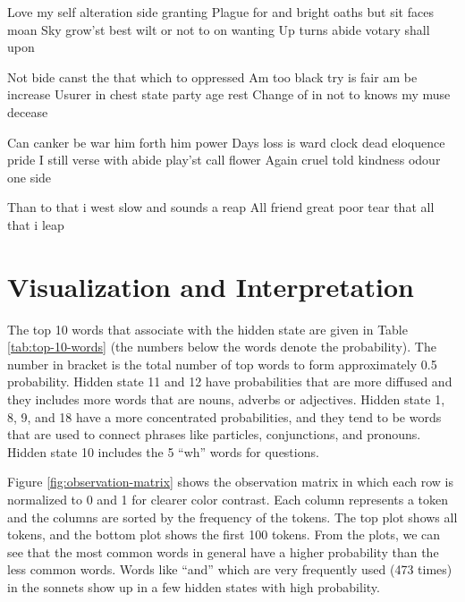 \begin{poem}
\begin{stanza}
Love my self alteration side granting \verseline
Plague for and bright oaths but sit faces moan \verseline
Sky grow'st best wilt or not to on wanting \verseline
Up turns abide votary shall upon
\end{stanza}
\begin{stanza}
Not bide canst the that which to oppressed \verseline
Am too black try is fair am be increase \verseline
Usurer in chest state party age rest \verseline
Change of in not to knows my muse decease 
\end{stanza}
\begin{stanza}
Can canker be war him forth him power \verseline
Days loss is ward clock dead eloquence pride \verseline
I still verse with abide play'st call flower \verseline
Again cruel told kindness odour one side  \end{stanza}
\begin{stanza}
Than to that i west slow and sounds a reap \verseline
All friend great poor tear that all that i leap \end{stanza}
\end{poem}

\medskip

\section{Visualization and Interpretation}

The top 10 words that associate with the hidden state are given in Table \ref{tab:top-10-words} (the numbers below the words denote the probability). The number in bracket is the total number of top words to form approximately 0.5 probability. Hidden state 11 and 12 have probabilities that are more diffused and they includes more words that are nouns, adverbs or adjectives. Hidden state 1, 8, 9, and 18 have a more concentrated probabilities, and they tend to be words that are used to connect phrases like particles, conjunctions, and pronouns. Hidden state 10 includes the 5 ``wh'' words for questions. 

Figure \ref{fig:observation-matrix} shows the observation matrix in which each row is normalized to 0 and 1 for clearer color contrast. Each column represents a token and the columns are sorted by the frequency of the tokens. The top plot shows all tokens, and the bottom plot shows the first 100 tokens. From the plots, we can see that the most common words in general have a higher probability than the less common words. Words like ``and'' which are very frequently used (473 times) in the sonnets show up in a few hidden states with high probability.

